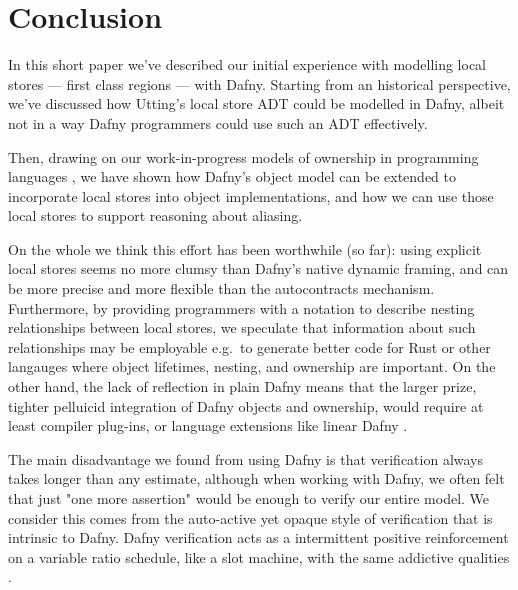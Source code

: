 \section{Conclusion}

In this short paper we've described our initial experience with
modelling local stores --- first class regions --- with Dafny.
Starting from an historical perspective, we've discussed how Utting's
local store ADT could be modelled in Dafny, albeit not in a way Dafny
programmers could use such an ADT effectively.

Then, drawing on our work-in-progress models of ownership in
programming languages \cite{dafnydala-ftfjp2024}, we have shown how
Dafny's object model can be extended to incorporate local stores into
object implementations, and how we can use those local stores to
support reasoning about aliasing.

On the whole we think this effort has been worthwhile (so far): using
explicit local stores seems no more clumsy than Dafny's native dynamic
framing, and can be more precise and more flexible than the
autocontracts mechanism.  Furthermore, by providing programmers with a
notation to describe nesting relationships between local stores, we
speculate that information about such relationships may be employable
e.g.\ to generate better code for Rust or other langauges where object
lifetimes, nesting, and ownership are important.  On the other hand,
the lack of reflection in plain Dafny means that the larger prize,
tighter pelluicid integration of Dafny objects and ownership, would
require at least compiler plug-ins, or language extensions like linear
Dafny \cite{linear-dafny-oopsla2022}.

The main disadvantage we found from using Dafny is that verification
always takes longer than any estimate, although when working with
Dafny, we often felt that just "one more assertion" would be enough to
verify our entire model. We consider this comes from the auto-active
yet opaque style of verification that is intrinsic to Dafny. Dafny verification acts as a intermittent positive reinforcement on a variable ratio schedule, like a slot machine, with the same addictive qualities
\cite{dafny-europlop2024}.



